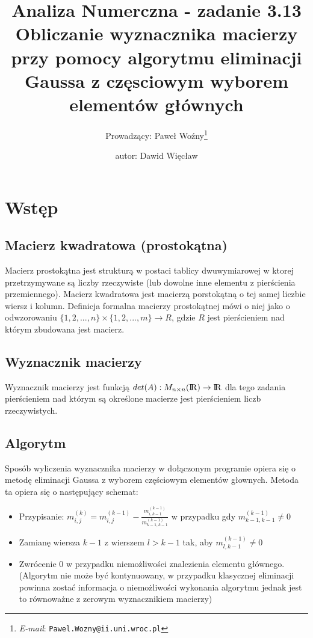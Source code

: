 \documentclass{article}
\title{\centering \Large Analiza Numerczna - zadanie 3.13 \\
\large Obliczanie wyznacznika macierzy przy pomocy algorytmu eliminacji Gaussa z częsciowym wyborem elementów głównych}
\author{\Large Prowadzący: Paweł Woźny\thanks{\textit{E-mail}: \texttt{Pawel.Wozny@ii.uni.wroc.pl}}%
	    \and \Large autor: Dawid Więcław}
\begin{document}
\maketitle
\tableofcontents
\thispagestyle{empty}
\setcounter{page}{1}
\newpage
\section{Wstęp}
\subsection{Macierz kwadratowa (prostokątna)}
Macierz prostokątna jest strukturą w postaci tablicy dwuwymiarowej w ktorej przetrzymywane są liczby rzeczywiste (lub dowolne inne elementu z pierścienia przemiennego). Macierz kwadratowa jest macierzą porstokątną o tej samej liczbie wiersz i kolumn. Definicja formalna macierzy prostokątnej mówi o niej jako o odwzorowaniu $\{1,2, ..., n\} \times \{1, 2, ..., m\} \to R$, gdzie $R$ jest pierścieniem nad którym zbudowana jest macierz. 
\subsection{Wyznacznik macierzy}
\large
\hspace{3mm} Wyznacznik macierzy jest funkcją $det(A): M_{n \times n}({\rm I\!R}) \to {\rm I\!R}$ dla tego zadania pierścieniem nad którym są określone macierze jest pierścieniem liczb rzeczywistych.
\subsection{Algorytm}
\hspace{3mm} Sposób wyliczenia wyznacznika macierzy w dołączonym programie opiera się o metodę eliminacji Gaussa z wyborem częściowym elementów głownych. Metoda ta opiera się o następujący schemat:
\begin{itemize} 
    \item Przypisanie: $m_{i,j}^{(k)}=m_{i,j}^{(k-1)} - \frac{m_{i,k-1}^{(k-1)}}{m_{k-1,k-1}^{(k-1)}}$ w przypadku gdy $m_{k-1,k-1}^{(k-1)} \neq 0$
    \item Zamianę wiersza $k-1$ z wierszem $l>k-1$ tak, aby $m_{l,k-1}^{(k-1)} \neq 0$
    \item Zwrócenie 0 w przypadku niemożliwości znalezienia elementu głównego. (Algorytm nie może być kontynuowany, w przypadku klasycznej eliminacji powinna zostać informacja o niemożliwości wykonania algorytmu jednak jest to równoważne z zerowym wyznacznikiem macierzy)
\end{itemize}
\end{document}
